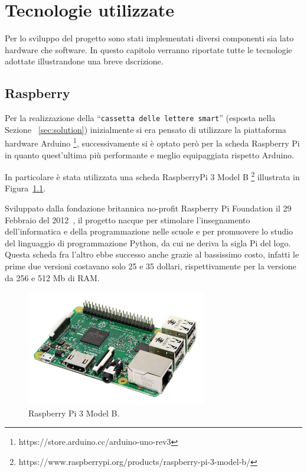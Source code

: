 \chapter{Tecnologie utilizzate}
\label{ch:technologies}
Per lo sviluppo del progetto sono stati implementati diversi componenti sia lato hardware che software. 
In questo capitolo verranno riportate tutte le tecnologie adottate illustrandone una breve dscrizione.

\section{Raspberry}
\label{sec:raspberry}
Per la realizzazione della ``\texttt{cassetta delle lettere smart}'' (esposta nella Sezione ~\ref{sec:solution}) inizialmente si era pensato di utilizzare la piattaforma 
hardware Arduino \footnote{https://store.arduino.cc/arduino-uno-rev3}, successivamente si è optato però per la scheda Raspberry Pi in quanto quest'ultima più 
performante e meglio equipaggiata rispetto Arduino.

In particolare è stata utilizzata una scheda RaspberryPi 3 Model B \footnote{https://www.raspberrypi.org/products/raspberry-pi-3-model-b/} illustrata in 
Figura~\ref{photo_raspberry}.

Sviluppato dalla fondazione britannica no-profit Raspberry Pi Foundation il 29 Febbraio del 2012~\cite{stroyOFraspberry_Raspbian}, il progetto nacque per stimolare 
l'insegnamento dell'informatica e della programmazione nelle scuole e per promuovere lo studio del linguaggio di programmazione Python, da cui ne deriva la sigla 
Pi del logo.
Questa scheda fra l'altro ebbe successo anche grazie al bassissimo costo, infatti le prime due versioni costavano solo 25 e 35 dollari, rispettivamente 
per la versione da 256 e 512 Mb di RAM.
\begin{figure}[htb]
    \centering
    \includegraphics[width=0.7\textwidth]{images/raspberryPI.png}
    \caption{Raspberry Pi 3 Model B.}
    \label{photo_raspberry}
\end{figure}

